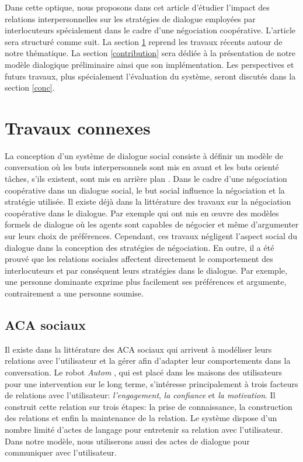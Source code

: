\documentclass [french]{sig-alternate-05-2015}
\begin{document}
\par Dans cette optique, nous proposons dans cet article d'étudier l'impact des relations interpersonnelles sur les stratégies de dialogue employées par interlocuteurs spécialement dans le cadre d'une négociation coopérative. L'article sera structuré comme suit. La section \ref{RW} reprend les travaux récents autour de notre thématique. La section \ref{contribution} sera dédiée à la présentation de notre modèle dialogique préliminaire ainsi que son implémentation. Les perspectives et futurs travaux, plus spécialement l'évaluation du système, seront discutés dans la section \ref{conc}.

\section{Travaux connexes}
\label{RW}
  
La conception d'un système de dialogue social consiste à définir un modèle de conversation où les buts interpersonnels sont mis en avant et les buts orienté tâches, s'ils existent, sont mis en arrière plan \cite{bickmore2005establishing}. Dans le cadre d'une négociation coopérative dans un dialogue social, le but social influence la négociation et la stratégie utilisée. Il existe déjà dans la littérature des travaux sur la négociation coopérative dans le dialogue. Par exemple \cite{Amgoud2002, daskalopulu1998handling} qui ont mis en œuvre des modèles formels de dialogue où les agents sont capables de négocier et même d'argumenter sur leurs choix de préférences. Cependant, ces travaux négligent l'aspect social du dialogue dans la conception des stratégies de négociation. En outre, il a été prouvé que les relations sociales affectent directement le comportement des interlocuteurs \cite{bickmore2012empirical, bickmore2005establishing, moon1998intimate, nass2000does} et par conséquent leurs stratégies dans le dialogue. Par exemple, une personne dominante exprime plus facilement ses préférences et argumente, contrairement a une personne soumise. 

\subsection{ACA sociaux}

\par Il existe dans la littérature des  ACA sociaux  qui arrivent à modéliser leurs relations avec l'utilisateur et la gérer afin d'adapter leur comportements dans la conversation. Le robot \textit{Autom} \cite{kidd2005sociable}, qui est placé dans les maisons des utilisateurs pour une intervention sur le long terme, s'intéresse principalement à trois facteurs de relations avec l'utilisateur: \textit{l'engagement}, \textit{la confiance} et \textit{la motivation}. Il construit cette relation sur trois étapes: la prise de connaissance, la construction des relations et enfin la maintenance de la relation. Le système dispose d'un nombre limité d'actes de langage pour  entretenir sa relation avec l'utilisateur. Dans notre modèle, nous utiliserons aussi des actes de dialogue pour communiquer avec l'utilisateur.
\end{document}
